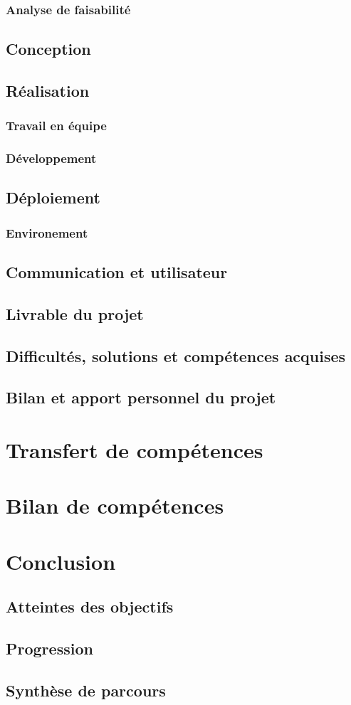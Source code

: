 \documentclass[12pt,a4paper]{report}
\begin{document}
\subsubsection{Analyse de faisabilité}
\subsection{Conception}
\subsection{Réalisation}
\subsubsection{Travail en équipe}
\subsubsection{Développement}
\subsection{Déploiement}
\subsubsection{Environement}
\subsection{Communication et utilisateur}
\subsection{Livrable du projet}
\subsection{Difficultés, solutions et compétences acquises}
\subsection{Bilan et apport personnel du projet}

\section{Transfert de compétences}

\section{Bilan de compétences}

\section{Conclusion}
\subsection{Atteintes des objectifs}
\subsection{Progression}
\subsection{Synthèse de parcours}
\end{document}
